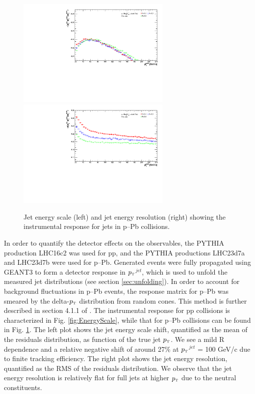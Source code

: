 \documentclass[ALICE]{ALICE_analysis_notes}
\newcommand{\pT}{$p_{\mbox{\tiny T}}$\xspace}
\newcommand{\pPb}{{\mbox{p--Pb}}\xspace}
\newcommand{\pp}{pp\xspace}
\begin{document}
\begin{figure}[h!]
    \centering
    \begin{multicols}{2}
            \includegraphics[width=7.5cm]{figures/pPbFigures/EnergyScale/EnergyScaleMean.pdf}
        \vfill\null 
        \columnbreak
            \includegraphics[width=7.5cm]{figures/pPbFigures/EnergyScale/EnergyScaleWidth.pdf}
        \vfill\null
    \end{multicols}
    \caption{Jet energy scale (left) and jet energy resolution (right) showing the instrumental response for jets in \pPb collisions.}
    \label{fig:EnergyScalepPb}
\end{figure}

In order to quantify the detector effects on the observables, the PYTHIA production LHC16c2 was used for \pp, and the PYTHIA productions LHC23d7a and LHC23d7b were used for \pPb. Generated events were fully propagated using GEANT3 to form a detector response in \pT$^{jet}$, which is used to unfold the measured jet distributions (see section \ref{sec:unfolding}). In order to account for background fluctuations in \pPb events, the response matrix for \pPb was smeared by the delta-\pT distribution from random cones. This method is further described in section 4.1.1 of \cite{anaNoteHHassan}. The instrumental response for \pp collisions is characterized in Fig. \ref{fig:EnergyScale}, while that for \pPb collisions can be found in Fig. \ref{fig:EnergyScalepPb}. The left plot shows the jet energy scale shift, quantified as the mean of the residuals distribution, as function of the true jet \pT. We see a mild R dependence and a relative negative shift of around 27\% at \pT$^{jet}$ = 100 GeV/c due to finite tracking efficiency. The right plot shows the jet energy resolution, quantified as the RMS of the residuals distribution. We observe that the jet energy resolution is relatively flat for full jets at higher \pT due to the neutral constituents.
\end{document}
